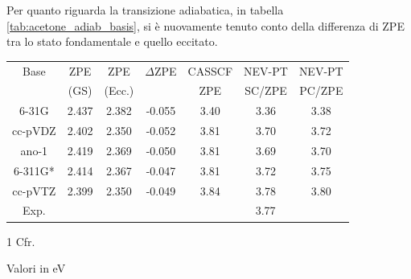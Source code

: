 Per quanto riguarda la transizione adiabatica, in tabella \ref{tab:acetone_adiab_basis},
si \`e nuovamente tenuto conto della differenza di ZPE tra lo stato fondamentale e quello eccitato.

\begin{center}
\begin{threeparttable}
\caption{\small Acetone - Energia di transizione $n_y \rightarrow \pistar$ adiabatica di singoletto, metodi CASSCF e CASSCF/NEV-PT}
\label{tab:acetone_adiab_basis}
{
\small
\begin{tabular}{|c|ccc|ccc|}
\hline
Base	& ZPE		& ZPE 			& $\Delta$ZPE	& CASSCF & NEV-PT & NEV-PT \\
		& (GS)		& (Ecc.)		& 				& ZPE 	& SC/ZPE & PC/ZPE \\
\hline
6-31G	& 2.437			& 2.382				& -0.055		&  3.40		 & 3.36 		  & 3.38		\\
cc-pVDZ & 2.402			& 2.350				& -0.052		&  3.81		 & 3.70			  & 3.72		\\
ano-1	& 2.419 		& 2.369				& -0.050		&  3.81 	 & 3.69		  	  & 3.70		\\
6-311G* & 2.414			& 2.367				& -0.047		&  3.81		 & 3.72			  & 3.75		\\
cc-pVTZ & 2.399         & 2.350				& -0.049		&  3.84		 & 3.78		 	  & 3.80		\\
\hline
\hline
Exp.\tnote{1} &				& 					& 				& \multicolumn{3}{c|}{3.77}					\\
\hline
\end{tabular}
}
\begin{tablenotes}
\small
 \item[1] Cfr. \cite{jcp-111-1-1999-205}
 \item[] Valori in eV
\end{tablenotes}
\end{threeparttable}
\end{center}

